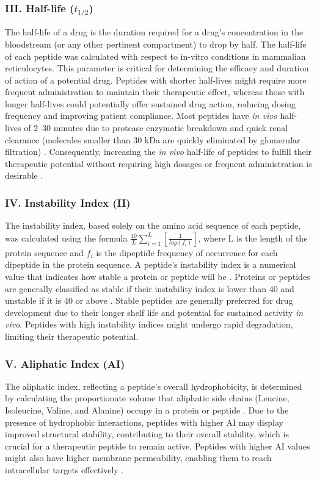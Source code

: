 \subsubsection*{III. Half-life ($t_{1/2}$)}
The half-life of a drug is the duration required for a drug's concentration in the bloodstream (or any other pertinent compartment) to drop by half. The half-life of each peptide was calculated with respect to in-vitro conditions in mammalian reticulocytes. This parameter is critical for determining the efficacy and duration of action of a potential drug. Peptides with shorter half-lives might require more frequent administration to maintain their therapeutic effect, whereas those with longer half-lives could potentially offer sustained drug action, reducing dosing frequency and improving patient compliance. Most peptides have \textit{in vivo} half-lives of 2–30 minutes due to protease enzymatic breakdown and quick renal clearance (molecules smaller than 30 kDa are quickly eliminated by glomerular filtration) \cite{penchala2015biomimetic}. Consequently, increasing the \textit{in vivo} half-life of peptides to fulfill their therapeutic potential without requiring high dosages or frequent administration is desirable \cite{penchala2015biomimetic}. 

\subsubsection*{IV. Instability Index (II)}
The instability index, based solely on the amino acid sequence of each peptide, was calculated using the formula $\frac{10}{L}\sum_{i=1}^{L} \left[\frac{1}{log(f_i)}\right] $, where L is the length of the protein sequence and $f_i$ is the dipeptide frequency of occurrence for each dipeptide in the protein sequence. A peptide's instability index is a numerical value that indicates how stable a protein or peptide will be \cite{Guruprasad1990}. Proteins or peptides are generally classified as stable if their instability index is lower than 40 and unstable if it is 40 or above \cite{Guruprasad1990}. Stable peptides are generally preferred for drug development due to their longer shelf life and potential for sustained activity \textit{in vivo}. Peptides with high instability indices might undergo rapid degradation, limiting their therapeutic potential.

\subsubsection*{V. Aliphatic Index (AI)}
The aliphatic index, reflecting a peptide's overall hydrophobicity, is determined by calculating the proportionate volume that aliphatic side chains (Leucine, Isoleucine, Valine, and Alanine) occupy in a protein or peptide \cite{panda2012physicochemical}. Due to the presence of hydrophobic interactions, peptides with higher AI may display improved structural stability, contributing to their overall stability, which is crucial for a therapeutic peptide to remain active. Peptides with higher AI values might also have higher membrane permeability, enabling them to reach intracellular targets effectively \cite{panda2012physicochemical}.

